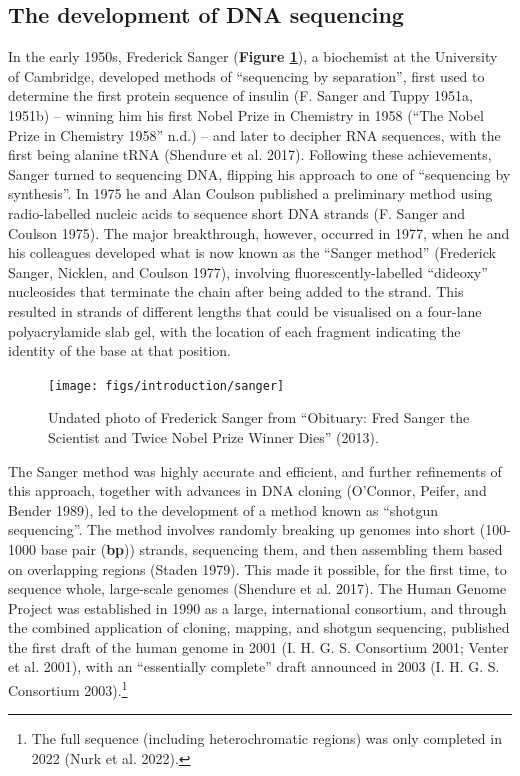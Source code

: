 \documentclass[
]{book}
\begin{document}
\hypertarget{the-development-of-dna-sequencing}{%
\subsection{The development of DNA sequencing}\label{the-development-of-dna-sequencing}}

In the early 1950s, Frederick Sanger (\textbf{Figure \ref{fig:sanger}}), a biochemist at the University of Cambridge, developed methods of ``sequencing by separation'', first used to determine the first protein sequence of insulin (F. Sanger and Tuppy 1951a, 1951b) -- winning him his first Nobel Prize in Chemistry in 1958 ({``The {Nobel Prize} in {Chemistry} 1958''} n.d.) -- and later to decipher RNA sequences, with the first being alanine tRNA (Shendure et al. 2017). Following these achievements, Sanger turned to sequencing DNA, flipping his approach to one of ``sequencing by synthesis''. In 1975 he and Alan Coulson published a preliminary method using radio-labelled nucleic acids to sequence short DNA strands (F. Sanger and Coulson 1975). The major breakthrough, however, occurred in 1977, when he and his colleagues developed what is now known as the ``Sanger method'' (Frederick Sanger, Nicklen, and Coulson 1977), involving fluorescently-labelled ``dideoxy'' nucleosides that terminate the chain after being added to the strand. This resulted in strands of different lengths that could be visualised on a four-lane polyacrylamide slab gel, with the location of each fragment indicating the identity of the base at that position.



\begin{figure}

{\centering \texttt{[image: figs/introduction/sanger]} 

}

\caption{Undated photo of Frederick Sanger from {``Obituary: {Fred Sanger} the Scientist and Twice {Nobel Prize} Winner Dies''} (2013).}\label{fig:sanger}
\end{figure}

The Sanger method was highly accurate and efficient, and further refinements of this approach, together with advances in DNA cloning (O'Connor, Peifer, and Bender 1989), led to the development of a method known as ``shotgun sequencing''. The method involves randomly breaking up genomes into short (100-1000 base pair (\textbf{bp})) strands, sequencing them, and then assembling them based on overlapping regions (Staden 1979). This made it possible, for the first time, to sequence whole, large-scale genomes (Shendure et al. 2017). The Human Genome Project was established in 1990 as a large, international consortium, and through the combined application of cloning, mapping, and shotgun sequencing, published the first draft of the human genome in 2001 (I. H. G. S. Consortium 2001; Venter et al. 2001), with an ``essentially complete'' draft announced in 2003 (I. H. G. S. Consortium 2003).\footnote{The full sequence (including heterochromatic regions) was only completed in 2022 (Nurk et al. 2022).}
\end{document}
